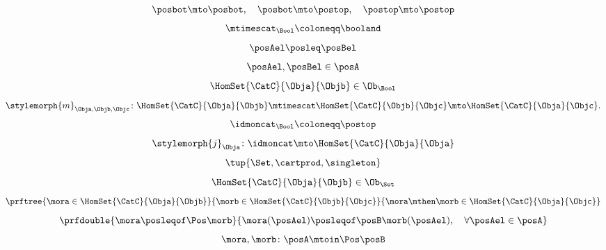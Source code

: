 {\begin{forslides}
\begin{equation*}
			\label{eq:poset_bool_c}
			\posbot\mto \posbot, \quad \posbot\mto \postop, \quad \postop\mto \postop
		\end{equation*}
		\begin{equation*}
			\label{eq:poset_bool_d}
			\mtimescat_\Bool \coloneqq \booland
		\end{equation*}
		\begin{equation*}
			\label{eq:poset_bool_e}
			\posAel\posleq \posBel
		\end{equation*}
		\begin{equation*}
			\label{eq:poset_bool_f}
			\posAel,\posBel \in \posA
		\end{equation*}
		\begin{equation*}
			\label{eq:poset_bool_g}
			\HomSet{\CatC}{\Obja}{\Objb}\in \Ob_\Bool
		\end{equation*}
		\begin{equation*}
			\label{eq:poset_bool_h}
			\stylemorph{m}_{\Obja,\Objb,\Objc}\colon \HomSet{\CatC}{\Obja}{\Objb}\mtimescat \HomSet{\CatC}{\Objb}{\Objc}\mto \HomSet{\CatC}{\Obja}{\Objc}.
		\end{equation*}
		\begin{equation*}
			\label{eq:poset_bool_i}
			\idmoncat_\Bool \coloneqq \postop
		\end{equation*}
		\begin{equation*}
			\label{eq:poset_bool_k}
			\stylemorph{j}_\Obja\colon \idmoncat \mto \HomSet{\CatC}{\Obja}{\Obja}
		\end{equation*}
		\begin{equation*}
			\label{eq:poset_bool_j}
			\tup{\Set, \cartprod, \singleton}
		\end{equation*}
		\begin{equation*}
			\label{eq:poset_bool_l}
			\HomSet{\CatC}{\Obja}{\Objb}\in \Ob_\Set
		\end{equation*}
		\begin{equation*}
			\label{eq:poset_bool_m}
			\prftree{\mora \in \HomSet{\CatC}{\Obja}{\Objb}}{\morb \in \HomSet{\CatC}{\Objb}{\Objc}}{{\mora\mthen \morb \in \HomSet{\CatC}{\Obja}{\Objc}}}
		\end{equation*}
		\begin{equation*}
			\label{eq:poset_pos_a}
			\prfdouble{
				\mora \posleqof\Pos \morb}{\mora(\posAel)\posleqof\posB \morb(\posAel), \quad \forall \posAel \in \posA}
		\end{equation*}
		\begin{equation*}
			\label{eq:poset_pos_b}
			\mora,\morb\colon \posA\mtoin\Pos \posB

\end{equation*}
\end{forslides}}

